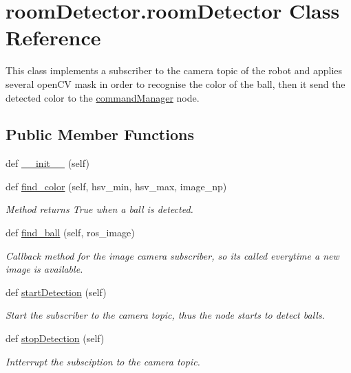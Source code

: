 \hypertarget{classroomDetector_1_1roomDetector}{}\section{room\+Detector.\+room\+Detector Class Reference}
\label{classroomDetector_1_1roomDetector}


This class implements a subscriber to the camera topic of the robot and applies several open\+CV mask in order to recognise the color of the ball, then it send the detected color to the \hyperlink{namespacecommandManager}{command\+Manager} node.  


\subsection*{Public Member Functions}
\begin{DoxyCompactItemize}
\item 
def \hyperlink{classroomDetector_1_1roomDetector_a1038f6f11c424041c0d9584b6f9c6833}{\+\_\+\+\_\+init\+\_\+\+\_\+} (self)
\item 
def \hyperlink{classroomDetector_1_1roomDetector_a4c27707debecd7e07f55f0e66f460b37}{find\+\_\+color} (self, hsv\+\_\+min, hsv\+\_\+max, image\+\_\+np)
\begin{DoxyCompactList}\small\item\em Method returns True when a ball is detected. \end{DoxyCompactList}\item 
def \hyperlink{classroomDetector_1_1roomDetector_a6c045c0740ea0cee247c81d20a9d1c91}{find\+\_\+ball} (self, ros\+\_\+image)
\begin{DoxyCompactList}\small\item\em Callback method for the image camera subscriber, so it\textquotesingle{}s called everytime a new image is available. \end{DoxyCompactList}\item 
def \hyperlink{classroomDetector_1_1roomDetector_aa8a2aea1db8ce538d11ddb501fae2822}{start\+Detection} (self)
\begin{DoxyCompactList}\small\item\em Start the subscriber to the camera topic, thus the node starts to detect balls. \end{DoxyCompactList}\item 
def \hyperlink{classroomDetector_1_1roomDetector_a1b30655196cae01d824ddeab2bb7e0e3}{stop\+Detection} (self)
\begin{DoxyCompactList}\small\item\em Intterrupt the subsciption to the camera topic. \end{DoxyCompactList}\end{DoxyCompactItemize}
